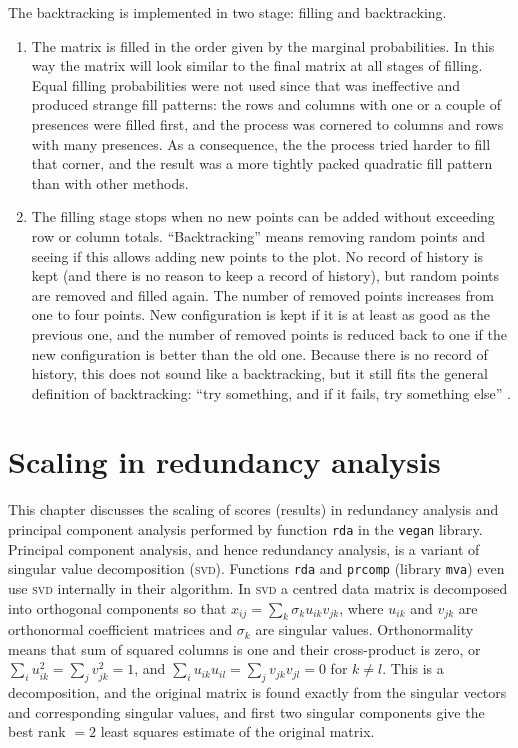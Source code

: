\documentclass[a4paper,10pt]{amsart}
\begin{document}
The backtracking is implemented in two stage: filling and
backtracking.
\begin{enumerate}
  \item The matrix is filled in the order given by the marginal
    probabilities. In this way the matrix will look similar to the
    final matrix at all stages of filling. Equal filling probabilities
    were not used since that was ineffective and produced strange fill
    patterns: the rows and columns with one or a couple of presences
    were filled first, and the process was cornered to columns and
    rows with many presences. As a consequence, the the process tried
    harder to fill that corner, and the result was a more tightly
    packed quadratic fill pattern than with other methods.
  \item The filling stage stops when no new points can be added
    without exceeding row or column totals. ``Backtracking'' means
    removing random points and seeing if this allows adding new points
    to the plot. No record of history is kept (and there is no reason
    to keep a record of history), but random points are removed and
    filled again. The number of removed points increases from one to
    four points. New configuration is kept if it is at least as good
    as the previous one, and the number of removed points is reduced
    back to one if the new configuration is better than the old one.
    Because there is no record of history, this does not sound like a
    backtracking, but it still fits the general definition of
    backtracking: ``try something, and if it fails, try something
    else'' \cite{Sedgewick90}.
\end{enumerate}


\section{Scaling in redundancy analysis}

This chapter discusses the scaling of scores (results) in redundancy
analysis and principal component analysis performed by function
\texttt{rda} in the \texttt{vegan} library.  Principal component
analysis, and hence redundancy analysis, is a variant of singular
value decomposition (\textsc{svd}).  Functions \texttt{rda} and
\texttt{prcomp} (library \texttt{mva}) even use \textsc{svd}
internally in their algorithm.  In \textsc{svd} a centred data matrix
is decomposed into orthogonal components so that $x_{ij} = \sum_k
\sigma_k u_{ik} v_{jk}$, where $u_{ik}$ and $v_{jk}$ are orthonormal
coefficient matrices and $\sigma_k$ are singular values.
Orthonormality means that sum of squared columns is one and their
cross-product is zero, or $\sum_i u_{ik}^2 = \sum_j v_{jk}^2 = 1$, and
$\sum_i u_{ik} u_{il} = \sum_j v_{jk} v_{jl} = 0$ for $k \neq l$. This
is a decomposition, and the original matrix is found exactly from the
singular vectors and corresponding singular values, and first two
singular components give the best rank $=2$ least squares estimate of
the original matrix.
\end{document}
